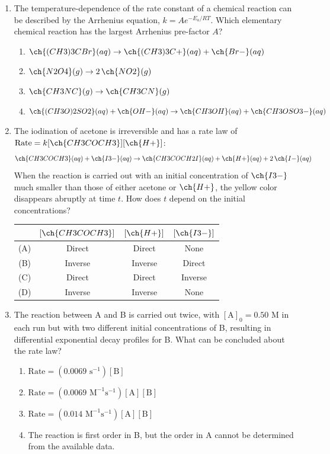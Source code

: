 \documentclass[twocolumn,10pt]{article}
\begin{document}
\begin{enumerate}[label=\arabic*., leftmargin=*]
\item The temperature-dependence of the rate constant of a chemical reaction can be described by the Arrhenius equation, $k = Ae^{-E_a/RT}$. Which elementary chemical reaction has the largest Arrhenius pre-factor $A$?
\begin{enumerate}[label=(\Alph*)]
    \item $\ch{(CH3)3CBr}(aq) \rightarrow \ch{(CH3)3C+}(aq) + \ch{Br-}(aq)$
    \item $\ch{N2O4}(g) \rightarrow 2\,\ch{NO2}(g)$
    \item $\ch{CH3NC}(g) \rightarrow \ch{CH3CN}(g)$
    \item $\ch{(CH3O)2SO2}(aq) + \ch{OH-}(aq) \rightarrow \ch{CH3OH}(aq) + \ch{CH3OSO3-}(aq)$
\end{enumerate}

\item The iodination of acetone is irreversible and has a rate law of $\text{Rate} = k[\ch{CH3COCH3}][\ch{H+}]$:
\[ \ch{CH3COCH3}(aq) + \ch{I3-}(aq) \rightarrow \ch{CH3COCH2I}(aq) + \ch{H+}(aq) + 2\,\ch{I-}(aq) \]
When the reaction is carried out with an initial concentration of $\ch{I3-}$ much smaller than those of either acetone or $\ch{H+}$, the yellow color disappears abruptly at time $t$. How does $t$ depend on the initial concentrations?
\begin{center}
\begin{tabular}{cccc}
 & $[\ch{CH3COCH3}]$ & $[\ch{H+}]$ & $[\ch{I3-}]$ \\ \hline
(A) & Direct & Direct & None \\
(B) & Inverse & Inverse & Direct \\
(C) & Direct & Direct & Inverse \\
(D) & Inverse & Inverse & None \\
\end{tabular}
\end{center}

\item The reaction between A and B is carried out twice, with $[\text{A}]_0 = 0.50\text{ M}$ in each run but with two different initial concentrations of B, resulting in differential exponential decay profiles for B. What can be concluded about the rate law?
\begin{enumerate}[label=(\Alph*)]
    \item $\text{Rate} = (0.0069\text{ s}^{-1})[\text{B}]$
    \item $\text{Rate} = (0.0069\text{ M}^{-1}\text{s}^{-1})[\text{A}][\text{B}]$
    \item $\text{Rate} = (0.014\text{ M}^{-1}\text{s}^{-1})[\text{A}][\text{B}]$
    \item The reaction is first order in B, but the order in A cannot be determined from the available data.
\end{enumerate}


\end{enumerate}
\end{document}
